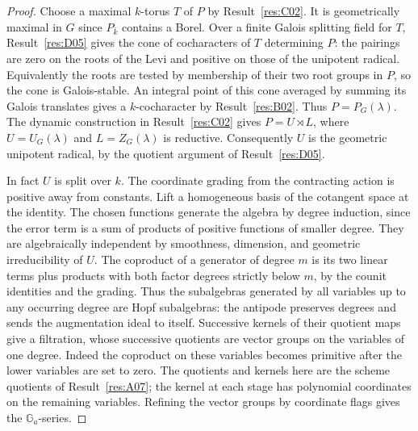 \documentclass[11pt,a4paper,openany,oneside]{book}
\theoremstyle{resultstyle}
\theoremstyle{definition}
\numberwithin{equation}{chapter}
\newcommand{\Ga}{\mathbb{G}_a}
\begin{document}
\begin{proof}
Choose a maximal \(k\)-torus \(T\) of \(P\) by
Result~\ref{res:C02}. It is geometrically maximal in \(G\)
since \(P_{\bar k}\) contains a Borel. Over a finite Galois
splitting field for \(T\), Result~\ref{res:D05} gives the cone
of cocharacters of \(T\) determining \(P\): the pairings are zero
on the roots of the Levi and positive on those of the unipotent
radical. Equivalently the roots are tested by membership of
their two root groups in \(P\), so the cone is Galois-stable.
An integral point of this cone averaged by summing its Galois
translates gives a \(k\)-cocharacter by Result~\ref{res:B02}.
Thus \(P=P_G(\lambda)\). The dynamic construction in
Result~\ref{res:C02} gives \(P=U\rtimes L\), where
\(U=U_G(\lambda)\) and \(L=Z_G(\lambda)\) is reductive.
Consequently \(U\) is the geometric unipotent radical,
by the quotient argument of Result~\ref{res:D05}.

In fact \(U\) is split over \(k\). The coordinate grading
from the contracting action is positive away from constants.
Lift a homogeneous basis of the cotangent space at the
identity. The chosen functions generate the algebra by
degree induction, since the error term is a sum of products
of positive functions of smaller degree. They are algebraically
independent by smoothness, dimension, and geometric
irreducibility of \(U\). The coproduct of a generator of
degree \(m\) is its two linear terms plus products with
both factor degrees strictly below \(m\), by the counit
identities and the grading. Thus the subalgebras generated by
all variables up to any occurring degree are Hopf subalgebras:
the antipode preserves degrees and sends the augmentation ideal
to itself. Successive kernels of their quotient maps give a
filtration, whose successive quotients are vector groups on the
variables of one degree. Indeed the coproduct on these
variables becomes primitive after the lower variables are set
to zero. The quotients and kernels here are the scheme quotients
of Result~\ref{res:A07}; the kernel at each stage has polynomial
coordinates on the remaining variables. Refining the vector
groups by coordinate flags gives the \(\Ga\)-series.


\end{proof}
\end{document}
